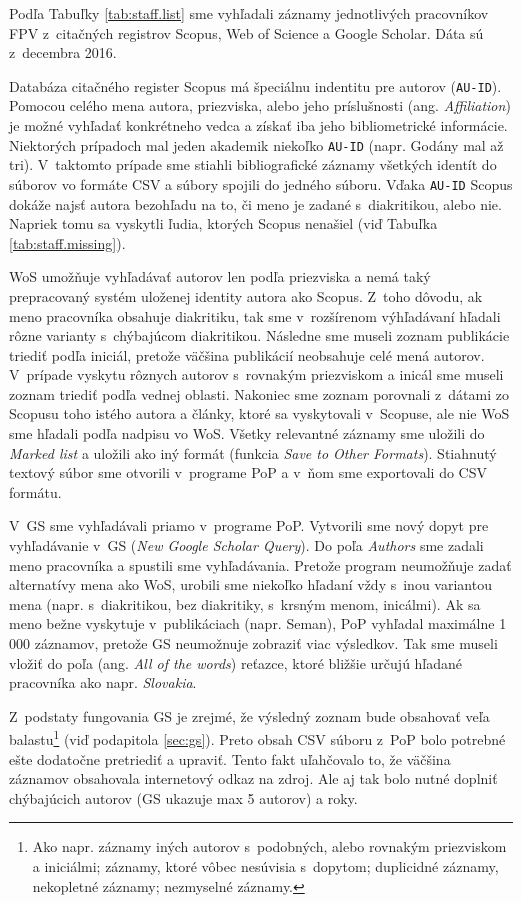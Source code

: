 Podľa Tabuľky \ref{tab:staff.list} sme vyhľadali záznamy jednotlivých
pracovníkov FPV z~citačných registrov Scopus, Web of Science a Google Scholar.
Dáta sú z~decembra 2016.

Databáza citačného register Scopus má špeciálnu indentitu pre autorov
(\texttt{AU-ID}).  Pomocou celého mena autora, priezviska, alebo jeho
príslušnosti (ang.  \emph{Affiliation}) je možné vyhľadať konkrétneho vedca a
získať iba jeho bibliometrické informácie. Niektorých prípadoch mal jeden
akademik niekoľko \texttt{AU-ID} (napr. Godány mal až tri). V~taktomto prípade
sme stiahli bibliografické záznamy všetkých identít do súborov vo formáte CSV a
súbory spojili do jedného súboru.  Vďaka  \texttt{AU-ID} Scopus dokáže najsť
autora bezohľadu na to, či meno je zadané s~diakritikou, alebo nie.  Napriek
tomu sa vyskytli ľudia, ktorých Scopus nenašiel (viď Tabuľka
\ref{tab:staff.missing}).

WoS umožňuje vyhľadávať autorov len podľa priezviska a nemá taký prepracovaný
systém uloženej identity autora ako Scopus. Z~toho dôvodu, ak meno pracovníka
obsahuje diakritiku, tak sme v~rozšírenom výhľadávaní hľadali rôzne varianty
s~chýbajúcom diakritikou. Následne sme museli zoznam publikácie triediť podľa
iniciál, pretože väčšina publikácií neobsahuje celé mená autorov. V~prípade
vyskytu rôznych autorov s~rovnakým priezviskom a inicál sme museli zoznam
triediť podľa vednej oblasti. Nakoniec sme zoznam porovnali z~dátami zo Scopusu
toho istého autora a články, ktoré sa vyskytovali v~Scopuse, ale nie WoS sme
hľadali podľa nadpisu vo WoS. Všetky relevantné záznamy sme uložili do
\emph{Marked list} a uložili ako iný formát (funkcia \emph{Save to Other
Formats}). Stiahnutý textový súbor sme otvorili v~programe PoP a v~ňom sme
exportovali do CSV formátu.

V~GS sme vyhľadávali priamo v~programe PoP. Vytvorili sme nový dopyt pre
vyhľadávanie v~GS (\emph{New Google Scholar Query}). Do poľa  \emph{Authors}
sme zadali meno pracovníka a spustili sme vyhľadávania. Pretože program
neumožňuje zadať alternatívy mena ako WoS, urobili sme niekoľko hľadaní vždy
s~inou variantou mena (napr. s~diakritikou, bez diakritiky, s~krsným menom,
inicálmi).  Ak sa meno bežne vyskytuje v~publikáciach (napr. Seman), PoP
vyhľadal maximálne 1\,000 záznamov, pretože GS neumožnuje zobraziť viac
výsledkov. Tak sme museli vložiť do poľa  (ang. \emph{All of
the words}) reťazce, ktoré bližšie určujú hľadané pracovníka ako napr.
\emph{Slovakia}.

Z~podstaty fungovania GS je zrejmé, že výsledný zoznam bude obsahovať veľa
balastu\footnote{Ako napr. záznamy iných autorov s~podobných, alebo rovnakým
priezviskom a iniciálmi; záznamy, ktoré vôbec nesúvisia s~dopytom; duplicidné
záznamy, nekopletné záznamy; nezmyselné záznamy.} (viď podapitola
\ref{sec:gs}).  Preto obsah CSV súboru z~PoP bolo potrebné ešte dodatočne
pretriediť a upraviť. Tento fakt uľahčovalo to, že väčšina záznamov obsahovala
internetový odkaz na zdroj. Ale aj tak bolo nutné doplniť chýbajúcich autorov
(GS ukazuje max 5 autorov) a roky.

